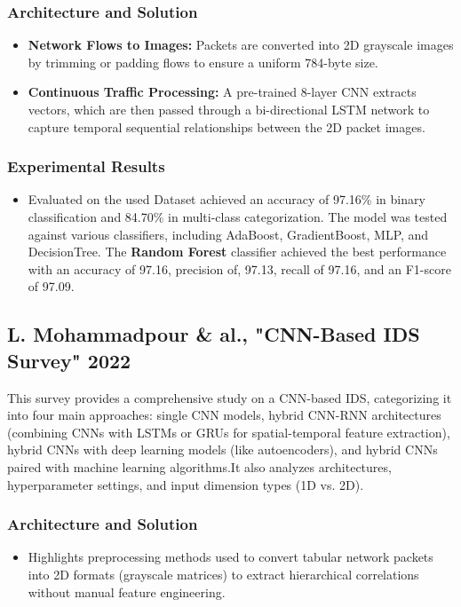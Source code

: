 \documentclass[12pt, a4paper]{report}
\begin{document}
\subsubsection{Architecture and Solution}
\begin{itemize}
    \item \textbf{Network Flows to Images:} Packets are converted into 2D grayscale images by trimming or padding flows to ensure a uniform 784-byte size.
    \item \textbf{Continuous Traffic Processing:} A pre-trained 8-layer CNN extracts vectors, which are then passed through a bi-directional LSTM network to capture temporal sequential relationships between the 2D packet images.
\end{itemize}

\subsubsection{Experimental Results}
\begin{itemize}
    \item Evaluated on the used Dataset achieved an accuracy of 97.16\% in binary classification and 84.70\% in multi-class categorization. The model was tested against various classifiers, including AdaBoost, GradientBoost, MLP, and DecisionTree. The \textbf{Random Forest} classifier achieved the best performance with an accuracy of 97.16, precision of, 97.13, recall of 97.16, and an F1-score of 97.09.
\end{itemize}

\subsection{L. Mohammadpour \& al., "CNN-Based IDS Survey" 2022}
This survey \cite{mohammadpour2022survey} provides a comprehensive study on a CNN-based IDS, categorizing it into four main approaches: single CNN models, hybrid CNN-RNN architectures (combining CNNs with LSTMs or GRUs for spatial-temporal feature extraction), hybrid CNNs with deep learning models (like autoencoders), and hybrid CNNs paired with machine learning algorithms.It also analyzes architectures, hyperparameter settings, and input dimension types (1D vs. 2D).

\subsubsection{Architecture and Solution}
\begin{itemize}
    \item Highlights preprocessing methods used to convert tabular network packets into 2D formats (grayscale matrices) to extract hierarchical correlations without manual feature engineering.
\end{itemize}
\end{document}
